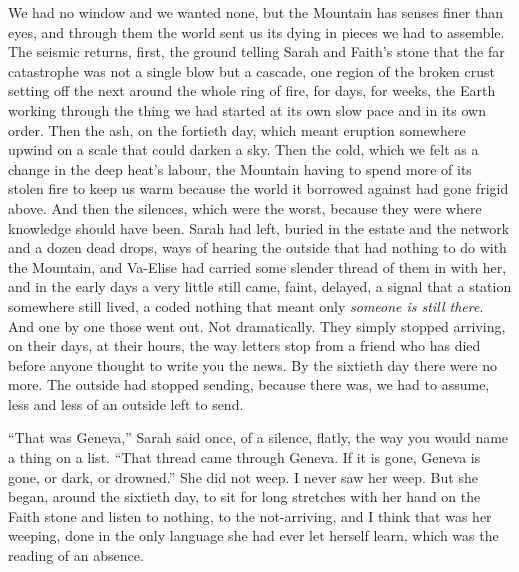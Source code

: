 We had no window and we wanted none, but the Mountain has senses finer than eyes, and through them the world sent us its dying in pieces we had to assemble. The seismic returns, first, the ground telling Sarah and Faith's stone that the far catastrophe was not a single blow but a cascade, one region of the broken crust setting off the next around the whole ring of fire, for days, for weeks, the Earth working through the thing we had started at its own slow pace and in its own order. Then the ash, on the fortieth day, which meant eruption somewhere upwind on a scale that could darken a sky. Then the cold, which we felt as a change in the deep heat's labour, the Mountain having to spend more of its stolen fire to keep us warm because the world it borrowed against had gone frigid above. And then the silences, which were the worst, because they were where knowledge should have been. Sarah had left, buried in the estate and the network and a dozen dead drops, ways of hearing the outside that had nothing to do with the Mountain, and Va-Elise had carried some slender thread of them in with her, and in the early days a very little still came, faint, delayed, a signal that a station somewhere still lived, a coded nothing that meant only \emph{someone is still there}. And one by one those went out. Not dramatically. They simply stopped arriving, on their days, at their hours, the way letters stop from a friend who has died before anyone thought to write you the news. By the sixtieth day there were no more. The outside had stopped sending, because there was, we had to assume, less and less of an outside left to send.\par

``That was Geneva,'' Sarah said once, of a silence, flatly, the way you would name a thing on a list. ``That thread came through Geneva. If it is gone, Geneva is gone, or dark, or drowned.'' She did not weep. I never saw her weep. But she began, around the sixtieth day, to sit for long stretches with her hand on the Faith stone and listen to nothing, to the not-arriving, and I think that was her weeping, done in the only language she had ever let herself learn, which was the reading of an absence.\par

